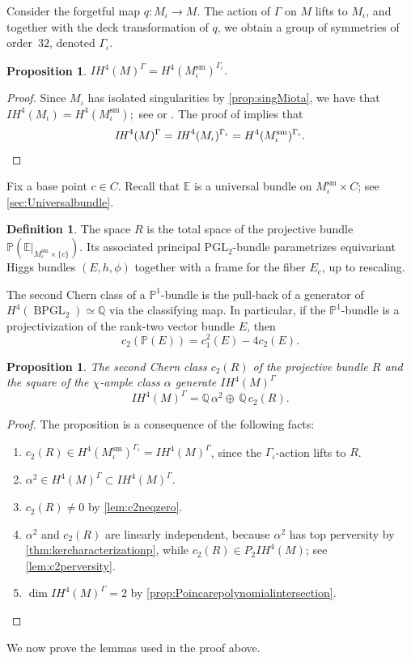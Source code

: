 \documentclass[JEP,XML,SOM,Unicode, NoEqCountersInSection,NoFloatCountersInSection,published]{cedram}
\newcommand{\cc}{\mathrm{c}}
\newcommand{\IH}{\mathit{IH}}
\newtheorem{prop}[thm]{Proposition}
\theoremstyle{definition}
\newtheorem{defn}[thm]{Definition}
\newcommand{\PP}{\mathbb{P}}
\newcommand{\QQ}{\mathbb{Q}}
\let\Runi R
\begin{document}
Consider the forgetful map $q\colon M_{\iota} \to M$. The action of $\Gamma$ on $M$ lifts to $M_{\iota}$, and toge\-ther with the deck transformation of $q$, we obtain a group of symmetries of order~$32$, denoted $\Gamma_{\iota}$.

\begin{prop}
$\IH^4(M)^{\Gamma} = H^4(M^{\mathrm{sm}}_{\iota})^{\Gamma_{\iota}}$.
\end{prop}
\begin{proof}
Since $M_{\iota}$ has isolated singularities by \cref{prop:singMiota}, we have that
$
\IH^4(M_{\iota}) = H^4(M^{\mathrm{sm}}_{\iota});
$
see \cite[\S 1.7]{GM81} or \cite[Lem.\,1]{Durfee95}. The proof of \cite[Prop.\,3]{GottscheSoergel93} implies that
\[
\IH^4(M)^{\Gamma} = \IH^4(M_{\iota})^{\Gamma_{\iota}}= H^4(M^{\mathrm{sm}}_{\iota})^{\Gamma_{\iota}}.\qedhere
\]
\end{proof}

Fix a base point $c \in C$. Recall that $\mathbb{E}$ is a universal bundle on $M^{\mathrm{sm}}_{\iota} \times C$; see \cref{sec:Universalbundle}.

\begin{defn}
The space $\Runi$ is the total space of the projective bundle $\mathbb{P}(\mathbb{E}|_{M^{\mathrm{sm}}_{\iota} \times \{c\}})$. Its associated principal $\mathrm{PGL}_2$-bundle parametrizes equivariant Higgs bundles $(E, h, \phi)$ together with a frame for the fiber $E_{\cc}$, up to rescaling.
\end{defn}

The second Chern class of a $\PP^1$-bundle is the pull-back of a generator of $H^4(\operatorname{BPGL}_2) \simeq \QQ$ via the classifying map. In particular, if the $\PP^1$-bundle is a projectivization of the rank-two vector bundle $E$, then
\[
c_2(\PP(E))=c^2_1(E)-4c_2(E).
\]
\begin{prop}\label{prop:IH4}
The second Chern class $c_2(\Runi)$ of the projective bundle $\Runi$ and the square of the $\chi$-ample class $\alpha$ generate $\IH^4(M)^{\Gamma}$
\[
\IH^4(M)^{\Gamma}= \QQ \,\alpha^2 \oplus \,\QQ \,c_2(\Runi).
\]
\end{prop}

\begin{proof}
The proposition is a consequence of the following facts:
\begin{enumerate}
\item $c_2(\Runi) \in H^4(M^{\mathrm{sm}}_{\iota})^{\Gamma_{\iota}} = \IH^4(M)^{\Gamma}$, since the $\Gamma_{\iota}$-action lifts to $\Runi$.
\item $\alpha^2 \in H^4(M)^{\Gamma} \subset \IH^4(M)^{\Gamma}$.
\item $c_2(\Runi) \neq 0$ by \cref{lem:c2neqzero}.
\item $\alpha^2$ and $c_2(\Runi)$ are linearly independent, because $\alpha^2$ has top perversity by \cref{thm:kercharacterizationp}, while $c_2(\Runi) \in P_2 \IH^4(M)$; see \cref{lem:c2perversity}.
\item $\dim \IH^4(M)^{\Gamma} =2$ by \cref{prop:Poincarepolynomialintersection}.\qedhere
\end{enumerate}
\end{proof}
We now prove the lemmas used in the proof above.
\end{document}
